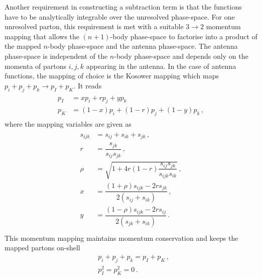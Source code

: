 \documentclass[main.tex]{subfiles}
\begin{document}
    Another requirement in constructing a subtraction term
    is that the functions have to be analytically integrable
    over the unresolved phase-space.
    For one unresolved parton, this requirement is met with a
    suitable $3 \rightarrow 2$ momentum mapping that allows
    the $(n+1)$-body phase-space to factorise into a product of
    the mapped $n$-body phase-space and the antenna phase-space.
    The antenna phase-space is independent of the $n$-body phase-space
    and depends only on the momenta of partons $i, j, k$ appearing
    in the antenna.
    In the case of antenna functions, the mapping of choice is
    the Kosower mapping \cite{Kosower:2002su} which maps
    $p_{i} + p_{j} + p_{k} \rightarrow p_{I} + p_{K}$. It reads
    \begin{align}\label{eqn:kosower_mapping}
        \begin{split}
        p_{I} &= x p_{i} + r p_{j} + y p_{k} \, \\
        p_{K} &= (1-x) p_{i} + (1-r) p_{j} + (1-y) p_{k} \, ,
        \end{split}
    \end{align}
    where the mapping variables are given as
    \begin{align}\label{eqn:kosower_variables}
        \begin{split}
        s_{ijk} &= s_{ij} + s_{ik} + s_{jk} \, , \\
        r &= \dfrac{s_{jk}}{s_{ij}s_{jk}} \, , \\
        \rho &= \sqrt{1 + 4r(1-r)\dfrac{s_{ij}s_{jk}}{s_{ijk}{s_{ik}}}} \, , \\
        x &= \dfrac{(1+\rho)s_{ijk}-2r s_{jk}}{2(s_{ij}+s_{ik})} \, , \\
        y &= \dfrac{(1-\rho)s_{ijk}-2r s_{ij}}{2(s_{jk}+s_{ik})} \, . \\
        \end{split}
    \end{align}
    This momentum mapping maintains momentum conservation
    and keeps the mapped partons on-shell
    \begin{equation}\label{eqn:kosower_conditions}
        \begin{split}
        &p_{i} + p_{j} + p_{k} = p_{I} + p_{K} \, , \\
        &p_{I}^{2} = p_{K}^{2} = 0 \, .
        \end{split}
    \end{equation}
\end{document}
